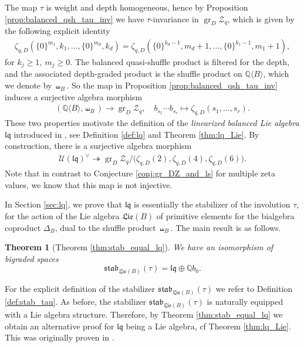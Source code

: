 \documentclass[11pt, a4paper]{amsart}
\newtheorem{thm}{Theorem}
\numberwithin{equation}{section}
\theoremstyle{definition}
\newcommand{\Q}{\mathbb{Q}}
\newcommand{\grqMZV}{\operatorname{gr}_D\mathcal{Z}_q}
\newcommand{\QB}{\Q\langle B\rangle}
\newcommand{\lqq}{\mathfrak{lq}}
\newcommand{\Lie}{\mathfrak{Lie}}
\newcommand{\stab}{\mathfrak{stab}}
\begin{document}
The map $\tau$ is weight and depth homogeneous, hence by Proposition \ref{prop:balanced_qsh_tau_inv} we have $\tau$-invariance in $\grqMZV$, which is given by the following explicit identity
\begin{align*}
\zeta_{q,D}(\{0\}^{m_1},k_1,\ldots,\{0\}^{m_d},k_d)=\zeta_{q,D}(\{0\}^{k_d-1},m_d+1,\ldots,\{0\}^{k_1-1},m_1+1),
\end{align*}
for $k_j\geq1,\ m_j\geq0$. The balanced quasi-shuffle product is filtered for the depth, and the associated depth-graded product is the shuffle product on $\QB$, which we denote by $\shuffle_B$. So the map in Proposition \ref{prop:balanced_qsh_tau_inv} induces a surjective algebra morphism
\begin{align*}
(\QB,\shuffle_B)\to\grqMZV,\quad b_{s_1}\cdots b_{s_r}\mapsto \zeta_{q,D}(s_1,\ldots,s_r).
\end{align*}
These two properties motivate the definition of the \emph{linearized balanced Lie algebra} $\lqq$ introduced in \cite{Bu25}, see Definition \ref{def:lq} and Theorem \ref{thm:lq_Lie}. By construction, there is a surjective algebra morphism
\begin{align*} %
\mathcal{U}(\lqq)^\vee\twoheadrightarrow \grqMZV/\big(\zeta_{q,D}(2),\zeta_{q,D}(4),\zeta_{q,D}(6)\big).
\end{align*}
Note that in contrast to Conjecture \ref{conj:gr_DZ_and_ls} for multiple zeta values, we know that this map is not injective.

In Section \ref{sec:lq}, we prove that $\lqq$ is essentially the stabilizer of the involution $\tau$, for the action of the Lie algebra $\Lie(B)$ of primitive elements for the bialgebra coproduct $\Delta_B$, dual to the shuffle product $\shuffle_B$. The main result is as follows.
\begin{thm}[Theorem \ref{thm:stab_equal_lq}] We have an isomorphism of bigraded spaces
\[
\stab_{\Lie(B)}(\tau)=\lqq\oplus \Q b_0.
\]    
\end{thm}
For the explicit definition of the stabilizer $\stab_{\Lie(B)}(\tau)$ we refer to Definition \ref{def:stab_tau}. As before, the stabilizer $\stab_{\Lie(B)}(\tau)$ is naturally equipped with a Lie algebra structure. Therefore, by Theorem \ref{thm:stab_equal_lq} we obtain an alternative proof for $\lqq$ being a Lie algebra, cf Theorem \ref{thm:lq_Lie}. This was originally proven in \cite{Bu25}.
\end{document}
